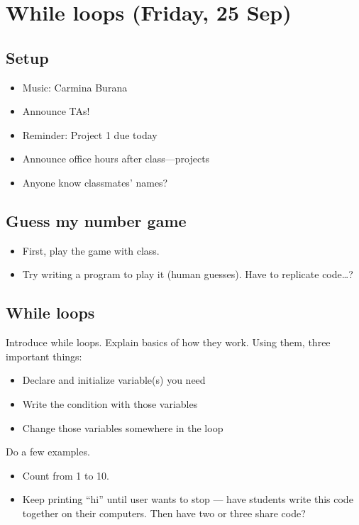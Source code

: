 \documentclass{article}
\begin{document}
\section*{While loops (Friday, 25 Sep)}

\subsection*{Setup}
\begin{itemize}
\item Music: Carmina Burana
\item Announce TAs!
\item Reminder: Project 1 due today
\item Announce office hours after class---projects
\item Anyone know classmates' names?
\end{itemize}

\subsection*{Guess my number game}

\begin{itemize}
\item First, play the game with class.
\item Try writing a program to play it (human guesses). Have to
  replicate code\dots?
\end{itemize}

\subsection*{While loops}

Introduce while loops.  Explain basics of how they work.
Using them, three important things:
\begin{itemize}
\item Declare and initialize variable(s) you need
\item Write the condition with those variables
\item Change those variables somewhere in the loop
\end{itemize}

Do a few examples.
\begin{itemize}
\item Count from 1 to 10.
\item Keep printing ``hi'' until user wants to stop --- have students
  write this code together on their computers.  Then have two or three
  share code?
\end{itemize}
\end{document}
